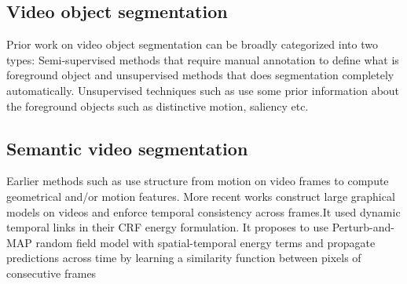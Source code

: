 \documentclass[10pt,twocolumn,letterpaper]{article}
\begin{document}
\subsection{Video object segmentation}
Prior work on video object segmentation can be broadly categorized into two types:
Semi-supervised methods that require manual annotation to
define what is foreground object and unsupervised methods
that does segmentation completely automatically. Unsupervised
techniques such as\cite{Taylor2015Causal}\cite{Papazoglou2014Fast} use
some prior information about the foreground objects such
as distinctive motion, saliency etc.
\subsection{Semantic video segmentation}
Earlier methods such
as use structure from motion on video frames to
compute geometrical and/or motion features. More recent
works construct large graphical
models on videos and enforce temporal consistency across
frames.It used dynamic temporal links in their CRF energy
formulation. It proposes to use Perturb-and-MAP
random field model with spatial-temporal energy terms and propagate predictions across time by learning a similarity
function between pixels of consecutive frames



{\small


}
\end{document}

